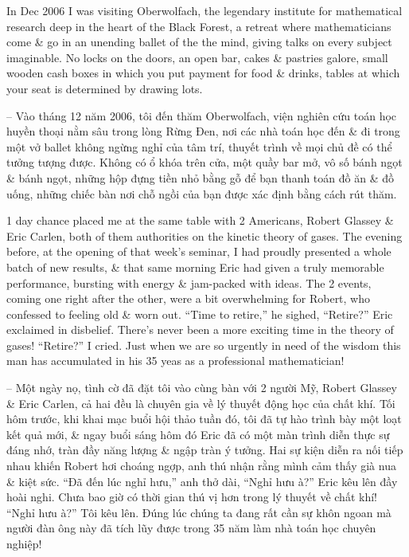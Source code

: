 \documentclass{article}
\begin{document}
\begin{enumerate}
	In Dec 2006 I was visiting Oberwolfach, the legendary institute for mathematical research deep in the heart of the Black Forest, a retreat where mathematicians come \& go in an unending ballet of the the mind, giving talks on every subject imaginable. No locks on the doors, an open bar, cakes \& pastries galore, small wooden cash boxes in which you put payment for food \& drinks, tables at which your seat is determined by drawing lots.
	
	-- Vào tháng 12 năm 2006, tôi đến thăm Oberwolfach, viện nghiên cứu toán học huyền thoại nằm sâu trong lòng Rừng Đen, nơi các nhà toán học đến \& đi trong một vở ballet không ngừng nghỉ của tâm trí, thuyết trình về mọi chủ đề có thể tưởng tượng được. Không có ổ khóa trên cửa, một quầy bar mở, vô số bánh ngọt \& bánh ngọt, những hộp đựng tiền nhỏ bằng gỗ để bạn thanh toán đồ ăn \& đồ uống, những chiếc bàn nơi chỗ ngồi của bạn được xác định bằng cách rút thăm.
	
	1 day chance placed me at the same table with 2 Americans, {\sc Robert Glassey \& Eric Carlen}, both of them authorities on the kinetic theory of gases. The evening before, at the opening of that week's seminar, I had proudly presented a whole batch of new results, \& that same morning Eric had given a truly memorable performance, bursting with energy \& jam-packed with ideas. The 2 events, coming one right after the other, were a bit overwhelming for Robert, who confessed to feeling old \& worn out. ``Time to retire,'' he sighed, ``Retire?'' Eric exclaimed in disbelief. There's never been a more exciting time in the theory of gases! ``Retire?'' I cried. Just when we are so urgently in need of the wisdom this man has accumulated in his 35 yeas as a professional mathematician!
	
	-- Một ngày nọ, tình cờ đã đặt tôi vào cùng bàn với 2 người Mỹ, {\sc Robert Glassey \& Eric Carlen}, cả hai đều là chuyên gia về lý thuyết động học của chất khí. Tối hôm trước, khi khai mạc buổi hội thảo tuần đó, tôi đã tự hào trình bày một loạt kết quả mới, \& ngay buổi sáng hôm đó Eric đã có một màn trình diễn thực sự đáng nhớ, tràn đầy năng lượng \& ngập tràn ý tưởng. Hai sự kiện diễn ra nối tiếp nhau khiến Robert hơi choáng ngợp, anh thú nhận rằng mình cảm thấy già nua \& kiệt sức. ``Đã đến lúc nghỉ hưu,'' anh thở dài, ``Nghỉ hưu à?'' Eric kêu lên đầy hoài nghi. Chưa bao giờ có thời gian thú vị hơn trong lý thuyết về chất khí! ``Nghỉ hưu à?'' Tôi kêu lên. Đúng lúc chúng ta đang rất cần sự khôn ngoan mà người đàn ông này đã tích lũy được trong 35 năm làm nhà toán học chuyên nghiệp!
	

\end{enumerate}
\end{document}
